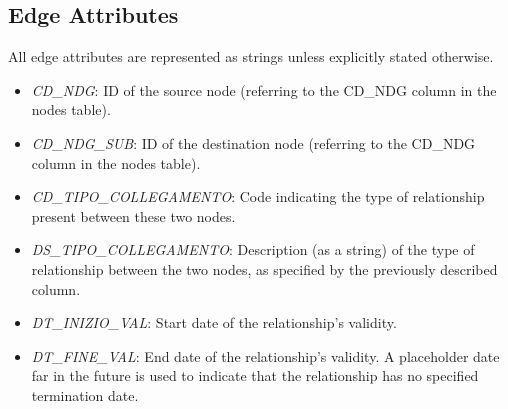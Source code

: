 \subsection*{Edge Attributes}
All edge attributes are represented as strings unless explicitly stated otherwise.
\begin{itemize}
    \item \emph{CD\_NDG}: ID of the source node (referring to the CD\_NDG column in the nodes table).
    \item \emph{CD\_NDG\_SUB}: ID of the destination node (referring to the CD\_NDG column in the nodes table).
    \item \emph{CD\_TIPO\_COLLEGAMENTO}: Code indicating the type of relationship present between these two nodes.
    \item \emph{DS\_TIPO\_COLLEGAMENTO}: Description (as a string) of the type of relationship between the two nodes, as specified by the previously described column.
    \item \emph{DT\_INIZIO\_VAL}: Start date of the relationship’s validity.
    \item \emph{DT\_FINE\_VAL}: End date of the relationship’s validity. A placeholder date far in the future is used to indicate that the relationship has no specified termination date.
\end{itemize}